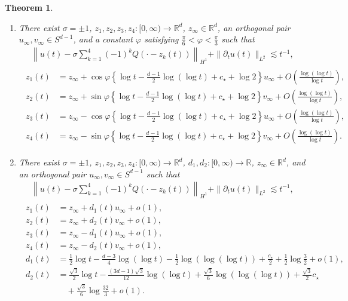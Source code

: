 \documentclass[reqno]{amsart}
\theoremstyle{plain}
\newtheorem{theorem}{Theorem}[section]
\theoremstyle{definition}
\numberwithin{equation}{section}
\begin{document}
\begin{theorem}
\begin{enumerate}
\item There exist $\sigma=\pm 1$, $z_1,z_2,z_3,z_4:[0,\infty)\to\mathbb{R}^d$, $z_{\infty}\in\mathbb{R}^d$, an orthogonal pair $u_{\infty},v_{\infty}\in S^{d-1}$, and a constant $\varphi$ satisfying $\frac{\pi}{6}<\varphi<\frac{\pi}{3}$ such that
\begin{align}\label{4rhombustheorem1}
\left\| u(t)-\sigma \sum_{k=1}^4 (-1)^kQ(\cdot-z_k(t))\right\|_{H^1}+\|{\partial}_tu(t)\|_{L^2}\lesssim t^{-1},
\end{align}
\begin{align}\label{4rhombustheorem2}
\begin{aligned}
z_1(t)&=z_{\infty}+\cos{\varphi}\left\{\log{t}-\frac{d-1}{2}\log{(\log{t})}+c_{\star}+\log{2} \right\}u_{\infty}+O\left(\frac{\log{(\log{t})}}{\log{t}}\right),
\\
z_2(t)&=z_{\infty}+\sin{\varphi}\left\{\log{t}-\frac{d-1}{2}\log{(\log{t})}+c_{\star}+\log{2} \right\}v_{\infty}+O\left(\frac{\log{(\log{t})}}{\log{t}}\right),
\\
z_3(t)&=z_{\infty}-\cos{\varphi}\left\{\log{t}-\frac{d-1}{2}\log{(\log{t})}+c_{\star}+\log{2} \right\}u_{\infty}+O\left(\frac{\log{(\log{t})}}{\log{t}}\right),
\\
z_4(t)&=z_{\infty}-\sin{\varphi}\left\{\log{t}-\frac{d-1}{2}\log{(\log{t})}+c_{\star}+\log{2} \right\}v_{\infty}+O\left(\frac{\log{(\log{t})}}{\log{t}}\right).
\end{aligned}
\end{align}

\item There exist $\sigma=\pm 1$, $z_1,z_2,z_3,z_4:[0,\infty)\to\mathbb{R}^d$, $d_1,d_2:[0,\infty)\to\mathbb{R}$, $z_{\infty}\in\mathbb{R}^d$, and an orthogonal pair $u_{\infty},v_{\infty}\in S^{d-1}$ such that
\begin{align}\label{4rhombustheorem3}
\left\| u(t)-\sigma \sum_{k=1}^4 (-1)^kQ(\cdot-z_k(t))\right\|_{H^1}+\|{\partial}_tu(t)\|_{L^2}\lesssim t^{-1},
\end{align}
\begin{align}\label{4rhombustheorem4}
\begin{aligned}
z_1(t)&=z_{\infty}+d_1(t)u_{\infty}+o(1),
\\
z_2(t)&=z_{\infty}+d_2(t)v_{\infty}+o(1),
\\
z_3(t)&=z_{\infty}-d_1(t)u_{\infty}+o(1),
\\
z_4(t)&=z_{\infty}-d_2(t)v_{\infty}+o(1),
\\
d_1(t)&=\frac{1}{2}\log{t}-\frac{d-3}{4}\log{(\log{t})}-\frac{1}{2}\log{(\log{(\log{t})})}+\frac{c_{\star}}{2}+\frac{1}{2}\log{\frac{3}{2}}+o(1),
\\
d_2(t)&=\frac{\sqrt{3}}{2}\log{t}-\frac{(3d-1)\sqrt{3}}{12}\log{(\log{t})}+\frac{\sqrt{3}}{6}\log{(\log{(\log{t})})}+\frac{\sqrt{3}}{2}c_{\star}
\\
&\quad+\frac{\sqrt{3}}{6}\log{\frac{32}{3}}+o(1).
\end{aligned}
\end{align}

\end{enumerate}
\end{theorem}
\end{document}
